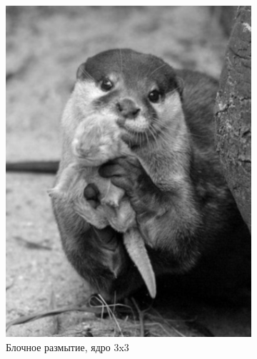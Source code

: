 \begin{figure}[ht!]
\begin{subfigure}[b]{0.5\linewidth}
        \includegraphics[width=0.95\linewidth]{block_3.png}
        \caption{Блочное размытие, ядро 3x3}
    \end{subfigure}
    \begin{subfigure}[b]{0.5\linewidth}
        \centering

\end{subfigure}
\end{figure}
